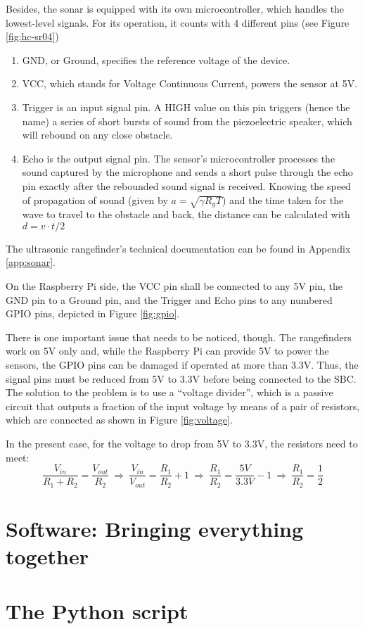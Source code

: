 Besides, the sonar is equipped with its own microcontroller, which handles the lowest-level signals.
For its operation, it counts with 4 different pins (see Figure \ref{fig:hc-sr04}) 
\begin{enumerate}
	\item GND, or Ground, specifies the reference voltage of the device.
	\item VCC, which stands for Voltage Continuous Current, powers the sensor at 5V.
	\item Trigger is an input signal pin.
		A HIGH value on this pin triggers (hence the name) a series of short bursts of sound from the piezoelectric speaker, which will rebound on any close obstacle.
	\item Echo is the output signal pin.
		The sensor's microcontroller processes the sound captured by the microphone and sends a short pulse through the echo pin exactly after the rebounded sound signal is received.
		Knowing the speed of propagation of sound (given by $a=\sqrt{\gamma R_g T}$) and the time taken for the wave to travel to the obstacle and back, the distance can be calculated with $d=v \cdot t/2$
\end{enumerate}
The ultrasonic rangefinder's technical documentation can be found in Appendix \ref{app:sonar}.

On the Raspberry Pi side, the VCC pin shall be connected to any 5V pin, the GND pin to a Ground pin, and the Trigger and Echo pins to any numbered GPIO pins, depicted in Figure \ref{fig:gpio}.



There is one important issue that needs to be noticed, though.
The rangefinders work on 5V only and, while the Raspberry Pi can provide 5V to power the sensors, the GPIO pins can be damaged if operated at more than 3.3V.
Thus, the signal pins must be reduced from 5V to 3.3V before being connected to the SBC.
The solution to the problem is to use a ``voltage divider'', which is a passive circuit that outputs a fraction of the input voltage by means of a pair of resistors, which are connected as shown in Figure \ref{fig:voltage}.



In the present case, for the voltage to drop from 5V to 3.3V, the resistors need to meet:
\begin{equation}
	\frac{V_{in}}{R_1+R_2}=\frac{V_{out}}{R_2} \ \Rightarrow\ \frac{V_{in}}{V_{out}}=\frac{R_1}{R_2}+1 \ \Rightarrow\ \frac{R_1}{R_2}=\frac{5V}{3.3V}-1 \ \Rightarrow\ \frac{R_1}{R_2}=\frac{1}{2} 
\end{equation}


\section{Software: Bringing everything together}


\section{The Python script}




